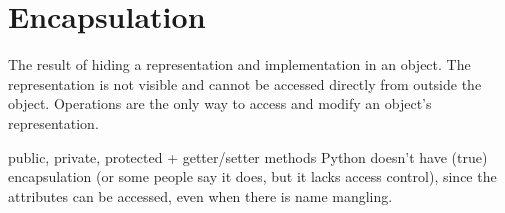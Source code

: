 \section{Encapsulation}


  \begin{definition}[Encapsulation] 
    The result of hiding a representation and implementation in an object. The representation is not visible and cannot be accessed directly from outside the object. Operations are the only way to access and modify an object's representation.  
  \end{definition} 

  public, private, protected + getter/setter methods 
  Python doesn't have (true) encapsulation (or some people say it does, but it lacks access control), since the attributes can be accessed, even when there is name mangling. 

